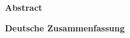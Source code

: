 \thispagestyle{plain}

\begin{addmargin}{0.5cm}

\centerline{\textbf{Abstract}}

\lipsum

\vskip 2cm

\centerline{\textbf{Deutsche Zusammenfassung}}

\lipsum
{}

\end{addmargin}
